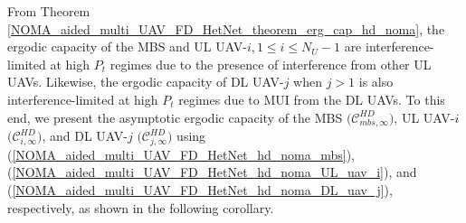 From Theorem \ref{NOMA_aided_multi_UAV_FD_HetNet_theorem_erg_cap_hd_noma}, the ergodic capacity of the MBS and UL UAV-$i, 1\leq i \leq N_U-1$ are interference-limited at high $P_t $ regimes due to the presence of interference from other UL UAVs. Likewise, the ergodic capacity of DL UAV-$j$ when $j>1$ is also interference-limited at high $P_t $ regimes due to MUI from the DL UAVs. To this end, we present the asymptotic ergodic capacity of the MBS $\big(\mathcal{C}_{mbs,\infty}^{HD}\big)$, UL UAV-$i$ $\big(\mathcal{C}_{i,\infty}^{HD}\big)$, and DL UAV-$j$ $\big(\mathcal{C}_{j,\infty}^{HD}\big)$ using (\ref{NOMA_aided_multi_UAV_FD_HetNet_hd_noma_mbs}), (\ref{NOMA_aided_multi_UAV_FD_HetNet_hd_noma_UL_uav_i}), and (\ref{NOMA_aided_multi_UAV_FD_HetNet_hd_noma_DL_uav_j}), respectively, as shown in the following corollary.

